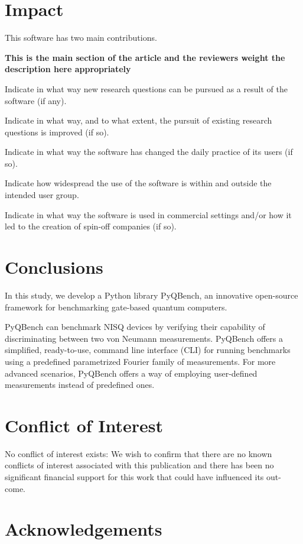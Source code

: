 \documentclass[preprint,12pt, a4paper]{elsarticle}
\newcommand{\1}{{\rm 1\hspace{-0.9mm}l}}
\begin{document}
\section{Impact }

This software has two main contributions. 



\textbf{This is the main section of the article and the reviewers weight the 
description here appropriately}

Indicate in what way new research questions can be pursued as a result of the 
software (if any).

Indicate in what way, and to what extent, the pursuit of existing research 
questions is improved (if so).

Indicate in what way the software has changed the daily practice of its users 
(if so).

Indicate how widespread the use of the software is within and outside the 
intended user group.

Indicate in what way the software is used in commercial settings and/or how it 
led to the creation of spin-off companies (if so).

\section{Conclusions}
\label{}

In this study, we develop  a Python library PyQBench, an innovative open-source framework for benchmarking 
gate-based quantum computers. 


PyQBench can benchmark NISQ devices by verifying their capability of
discriminating between two von Neumann measurements. PyQBench offers a simplified, ready-to-use,
command line interface (CLI) for running benchmarks using a predefined parametrized Fourier
family of measurements. For more advanced scenarios, PyQBench offers a way of employing user-defined
measurements instead of predefined ones.
\section{Conflict of Interest}
No conflict of interest exists: We wish to confirm that there are no known
conflicts of interest associated with this publication and there has been no
significant financial support for this work that could have influenced its out-
come.


\section*{Acknowledgements}
\end{document}
